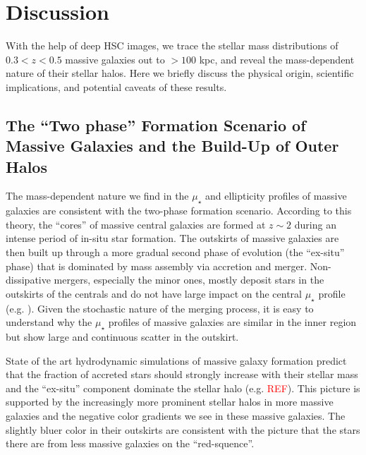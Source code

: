 \documentclass[a4paper,fleqn,usenatbib]{mnras}
\def\mden{{$\mu_{\star}$}}
\newcommand{\addref}{{\textcolor{red}{REF}}}
\begin{document}
\section{Discussion}
    \label{sec:discussion}
    
    With the help of deep HSC images, we trace the stellar mass distributions of 
    $0.3 < z < 0.5$ massive galaxies out to $>100$ kpc, and reveal the mass-dependent 
    nature of their stellar halos.
    Here we briefly discuss the physical origin, scientific implications, and potential 
    caveats of these results. 
    

\subsection{The ``Two phase'' Formation Scenario of Massive Galaxies and the 
            Build-Up of Outer Halos}
    \label{ssec:twophase}
            
    The mass-dependent nature we find in the \mden{} and ellipticity profiles of 
    massive galaxies are consistent with the two-phase formation scenario. 
    According to this theory, the ``cores'' of massive central galaxies are formed 
    at $z{\sim} 2$ during an intense period of in-situ star formation. 
    The outskirts of massive galaxies are then built up through a more gradual second 
    phase of evolution (the ``ex-situ'' phase) that is dominated by mass assembly via 
    accretion and merger.
    Non-dissipative mergers, especially the minor ones, mostly deposit stars in the 
    outskirts of the centrals and do not have large impact on the central \mden{} 
    profile (e.g. \citealt{Oogi2013, Bedorf2013}).
    Given the stochastic nature of the merging process, it is easy to understand why 
    the \mden{} profiles of massive galaxies are similar in the inner region but show
    large and continuous scatter in the outskirt. 
    
    State of the art hydrodynamic simulations of massive galaxy formation predict 
    that the fraction of accreted stars should strongly increase with their stellar 
    mass and the ``ex-situ'' component dominate the stellar halo (e.g.
    \citealt{RodriguezGomez2016} \addref{}). 
    This picture is supported by the increasingly more prominent stellar halos in 
    more massive galaxies and the negative color gradients we see in these massive 
    galaxies. 
    The slightly bluer color in their outskirts are consistent with the picture that 
    the stars there are from less massive galaxies on the ``red-squence''. 
    
\end{document}
